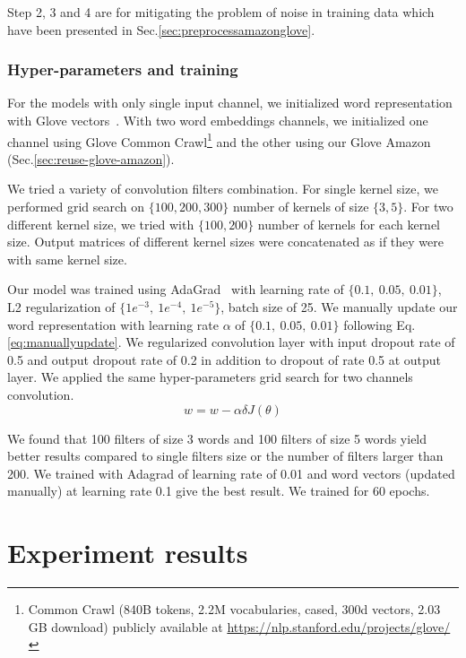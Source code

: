 Step 2, 3 and 4 are for mitigating the problem of noise in training data which have been presented in Sec.\ref{sec:preprocessamazonglove}.
\subsubsection{Hyper-parameters and training}
For the models with only single input channel, we initialized word representation with Glove vectors~\cite{glove}.
With two word embeddings channels, we initialized one channel using Glove Common Crawl\footnote{\label{glovecommoncrawl}Common Crawl (840B tokens, 2.2M vocabularies, cased, 300d vectors, 2.03 GB download) publicly available at \url{https://nlp.stanford.edu/projects/glove/}} and the other using our Glove Amazon (Sec.\ref{sec:reuse-glove-amazon}).

We tried a variety of convolution filters combination.
For single kernel size, we performed grid search on $\{100, 200, 300\}$ number of kernels of size $\{3, 5\}$.
For two different kernel size, we tried with $\{100, 200\}$ number of kernels for each kernel size.
Output matrices of different kernel sizes were concatenated as if they were with same kernel size.

Our model was trained using AdaGrad~\cite{duchi2011adaptive} with learning rate of $\{0.1,~ 0.05,~ 0.01\}$, L2 regularization of $\{1e^{-3},~ 1e^{-4}, ~ 1e^{-5} \}$, batch size of 25.
We manually update our word representation with learning rate $\alpha$ of $\{0.1,~0.05, ~0.01\}$ following Eq.\ref{eq:manuallyupdate}.
We regularized convolution layer with input dropout rate of 0.5 and output dropout rate of 0.2 in addition to dropout of rate 0.5 at output layer.
We applied the same hyper-parameters grid search for two channels convolution.
\begin{equation}
\label{eq:manuallyupdate}
w = w - \alpha\delta J(\theta)
\end{equation}

We found that 100 filters of size 3 words and 100 filters of size 5 words yield better results compared to single filters size or the number of filters larger than 200. We trained with Adagrad of learning rate of 0.01 and word vectors (updated manually) at learning rate 0.1 give the best result. We trained for 60 epochs.

\section{Experiment results}

